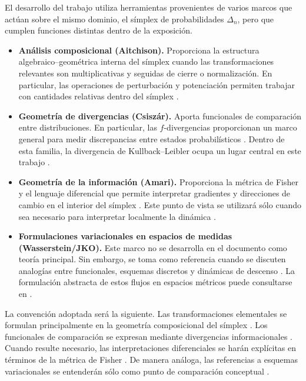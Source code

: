 \documentclass[12pt]{article}
\begin{document}
El desarrollo del trabajo utiliza herramientas provenientes de varios marcos que actúan sobre el mismo dominio, el símplex de probabilidades $\Delta_n$, pero que cumplen funciones distintas dentro de la exposición.

\begin{itemize}
    \item \textbf{Análisis composicional (Aitchison).} Proporciona la estructura algebraico--geométrica interna del símplex cuando las transformaciones relevantes son multiplicativas y seguidas de cierre o normalización. En particular, las operaciones de perturbación y potenciación permiten trabajar con cantidades relativas dentro del símplex \citep{Aitchison1986}.

    \item \textbf{Geometría de divergencias (Csiszár).} Aporta funcionales de comparación entre distribuciones. En particular, las $f$-divergencias proporcionan un marco general para medir discrepancias entre estados probabilísticos \citep{Csiszar1975}. Dentro de esta familia, la divergencia de Kullback--Leibler ocupa un lugar central en este trabajo \citep{KullbackLeibler1951}.

    \item \textbf{Geometría de la información (Amari).} Proporciona la métrica de Fisher y el lenguaje diferencial que permite interpretar gradientes y direcciones de cambio en el interior del símplex \citep{AmariNagaoka2000}. Este punto de vista se utilizará sólo cuando sea necesario para interpretar localmente la dinámica \citep{Amari2016}.

    \item \textbf{Formulaciones variacionales en espacios de medidas (Wasserstein/JKO).} Este marco no se desarrolla en el documento como teoría principal. Sin embargo, se toma como referencia cuando se discuten analogías entre funcionales, esquemas discretos y dinámicas de descenso \citep{JordanKinderlehrerOtto1998}. La formulación abstracta de estos flujos en espacios métricos puede consultarse en \citep{AmbrosioGigliSavare2005}.
\end{itemize}

La convención adoptada será la siguiente. Las transformaciones elementales se formulan principalmente en la geometría composicional del símplex \citep{Aitchison1986}. Los funcionales de comparación se expresan mediante divergencias informacionales \citep{Csiszar1975}. Cuando resulte necesario, las interpretaciones diferenciales se harán explícitas en términos de la métrica de Fisher \citep{Amari2016}. De manera análoga, las referencias a esquemas variacionales se entenderán sólo como punto de comparación conceptual \citep{JordanKinderlehrerOtto1998}.
\end{document}
